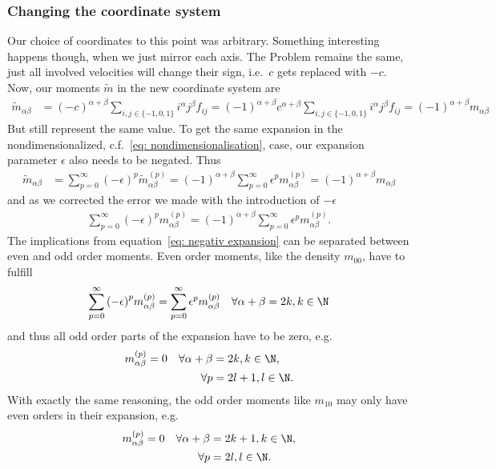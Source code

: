 \subsubsection{Changing the coordinate system}
\label{subs: Changing the coordinate system}
Our choice of coordinates to this point was arbitrary.
Something interesting happens though, when we just mirror each axis.
The Problem remains the same, just all involved velocities will change their sign, i.e.\ $c$ gets replaced with $-c$.
Now, our moments $\tilde{m}$ in the new coordinate system are
\begin{align}
  \tilde{m}_{\alpha\beta} &= {(-c)}^{\alpha + \beta}\sum_{i,j \in \{-1,0,1\}} i^\alpha j^\beta f_{ij}
  ={(-1)}^{\alpha + \beta}{c}^{\alpha + \beta}\sum_{i,j \in \{-1,0,1\}} i^\alpha j^\beta f_{ij}
  ={(-1)}^{\alpha + \beta}  m_{\alpha\beta}
\end{align}
But still represent the same value.
To get the same expansion in the nondimensionalized, c.f.~\eqref{eq: nondimensionalisation}, case, our expansion parameter $\epsilon$ also needs to be negated.
Thus
\begin{align}
    \tilde{m}_{\alpha\beta}
    & = \sum_{p=0}^{\infty} {(-\epsilon)}^p \tilde{m}_{\alpha\beta}^{(p)}
     = {(-1)}^{\alpha + \beta} \sum_{p=0}^{\infty} \epsilon^p m_{\alpha\beta}^{(p)}
    = {(-1)}^{\alpha + \beta}  m_{\alpha\beta}
\end{align}
and as we corrected the error we made with the introduction of $-\epsilon$
\begin{align}
  \label{eq: negativ expansion}
  \sum_{p=0}^{\infty} {(-\epsilon)}^p m_{\alpha\beta}^{(p)}
  = {(-1)}^{\alpha + \beta} \sum_{p=0}^{\infty} \epsilon^p m_{\alpha\beta}^{(p)}.
\end{align}
The implications from equation~\eqref{eq: negativ expansion} can be separated between even and odd order moments.
Even order moments, like the density $m_{00}$, have to fulfill
\begin{align}
  \label{eq: negativ expansion even}
  \sum_{p=0}^{\infty} {(-\epsilon)}^p m_{\alpha\beta}^{(p)}
  = \sum_{p=0}^{\infty} \epsilon^p m_{\alpha\beta}^{(p)} \quad \forall \alpha+\beta=2k, k\in\N
\end{align}
and thus all odd order parts of the expansion have to be zero, e.g.
\begin{equation}
  \begin{aligned}
    m_{\alpha\beta}^{(p)} = 0 \quad
    \forall\alpha+\beta & = 2k, k\in\N, \\
    \forall p & = 2l+1, l\in\N.
  \end{aligned}
\end{equation}
With exactly the same reasoning, the odd order moments like $m_{10}$ may only have even orders in their expansion, e.g.
\begin{equation}
  \begin{aligned}
    m_{\alpha\beta}^{(p)} = 0 \quad
    \forall\alpha+\beta & = 2k+1, k\in\N, \\
    \forall p & = 2l, l\in\N.
  \end{aligned}
\end{equation}
